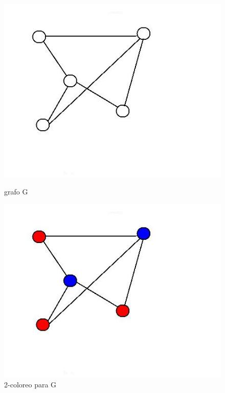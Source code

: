 \documentclass[11pt, a4paper, twoside]{article}
\begin{document}
\begin{enumerate}
				  \begin{figure}[H]
					\begin{minipage}{.6\textwidth}
					\centering
					\includegraphics[width=.8\linewidth]{imagenes/ej1_2}
					\caption{grafo G}
					\end{minipage}
					\begin{minipage}{.6\textwidth}
					\includegraphics[width=.8\linewidth]{imagenes/ej1_22}
					\caption{2-coloreo para G}
					\end{minipage}
				 \end{figure}
				 

\end{enumerate}
\end{document}
